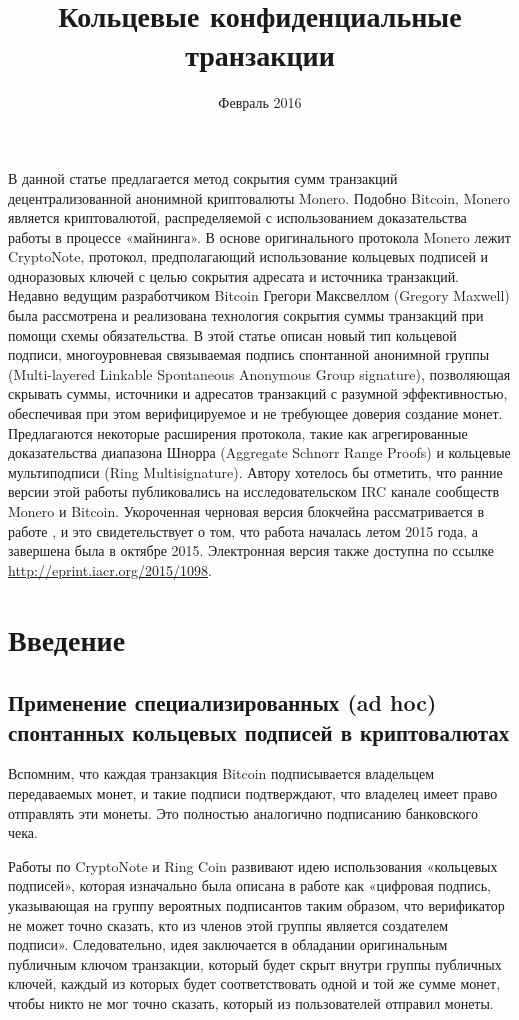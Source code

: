 \documentclass{mrl}
\title{Кольцевые конфиденциальные транзакции}
\date{Февраль 2016}
\theoremstyle{definition}
\numberwithin{thm}{section}
\begin{document}
\begin{center}
{}
\end{center}

В данной статье предлагается метод сокрытия сумм транзакций децентрализованной анонимной криптовалюты Monero. Подобно Bitcoin, Monero является криптовалютой, распределяемой с использованием доказательства работы в процессе «майнинга». В основе оригинального протокола Monero лежит CryptoNote, протокол, предполагающий использование кольцевых подписей и одноразовых ключей с целью сокрытия адресата и источника транзакций. Недавно ведущим разработчиком Bitcoin Грегори Максвеллом (Gregory Maxwell) была рассмотрена и реализована технология сокрытия суммы транзакций при помощи схемы обязательства. В этой статье описан новый тип кольцевой подписи, многоуровневая связываемая подпись спонтанной анонимной группы (Multi-layered Linkable Spontaneous Anonymous Group signature), позволяющая скрывать суммы, источники и адресатов транзакций с разумной эффективностью, обеспечивая при этом верифицируемое и не требующее доверия создание монет. Предлагаются некоторые расширения протокола, такие как агрегированные доказательства диапазона Шнорра (Aggregate Schnorr Range Proofs) и кольцевые мультиподписи (Ring Multisignature). Автору хотелось бы отметить, что ранние версии этой работы публиковались на исследовательском IRC канале сообществ Monero и Bitcoin. Укороченная черновая версия блокчейна рассматривается в работе \cite{Snoe}, и это свидетельствует о том, что работа началась летом 2015 года, а завершена была в октябре 2015. Электронная версия также доступна по ссылке \url{http://eprint.iacr.org/2015/1098}.

\section{Введение}
\subsection{Применение специализированных (ad hoc) спонтанных кольцевых подписей в криптовалютах}

Вспомним, что каждая транзакция Bitcoin подписывается владельцем передаваемых монет, и такие подписи подтверждают, что владелец имеет право отправлять эти монеты. Это полностью аналогично подписанию банковского чека.

Работы по CryptoNote \cite{CN} и Ring Coin \cite{B2} развивают идею использования «кольцевых подписей», которая изначально была описана в работе \cite{RST} как «цифровая подпись, указывающая на группу вероятных подписантов таким образом, что верификатор не может точно сказать, кто из членов этой группы является создателем подписи». Следовательно, идея заключается в обладании оригинальным публичным ключом транзакции, который будет скрыт внутри группы публичных ключей, каждый из которых будет соответствовать одной и той же сумме монет, чтобы никто не мог точно сказать, который из пользователей отправил монеты.
\end{document}
